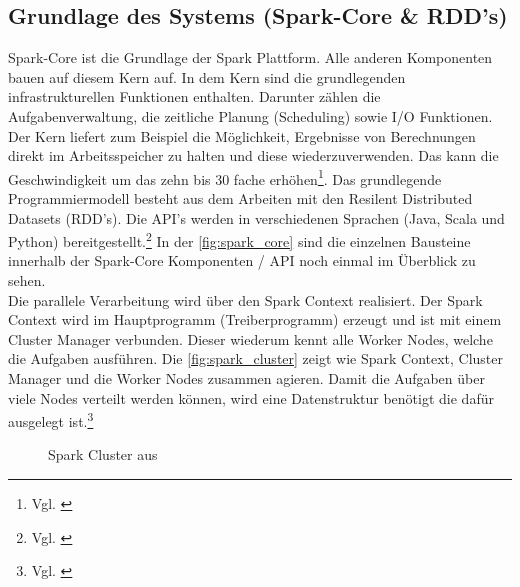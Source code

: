 \newpage
\subsection{Grundlage des Systems (Spark-Core \& RDD’s)}\label{sec_sparkcore}
Spark-Core ist die Grundlage der Spark Plattform. Alle anderen Komponenten bauen auf diesem Kern auf. In dem Kern sind die grundlegenden infrastrukturellen Funktionen enthalten. Darunter zählen die Aufgabenverwaltung, die zeitliche Planung (Scheduling) sowie I/O Funktionen.
Der Kern liefert zum Beispiel die Möglichkeit, Ergebnisse von Berechnungen direkt im Arbeitsspeicher zu halten und diese wiederzuverwenden. Das kann die Geschwindigkeit um das zehn bis 30 fache erhöhen\footnote{Vgl. \cite{VYL+16}}. 
Das grundlegende Programmiermodell besteht aus dem Arbeiten mit den Resilent Distributed Datasets (RDD's). Die API's werden in verschiedenen Sprachen (Java, Scala und Python) bereitgestellt.\footnote{Vgl. \cite{DATABRICK_ABOUT}} In der \autoref{fig:spark_core} sind die einzelnen Bausteine innerhalb der Spark-Core Komponenten / API noch einmal im Überblick zu sehen. \\
 

\noindent
Die parallele Verarbeitung wird über den Spark Context realisiert. Der Spark Context wird im Hauptprogramm (Treiberprogramm) erzeugt und ist mit einem Cluster Manager verbunden. Dieser wiederum kennt alle Worker Nodes, welche die Aufgaben ausführen. Die \autoref{fig:spark_cluster} zeigt wie Spark Context, Cluster Manager und die Worker Nodes zusammen agieren. Damit die Aufgaben über viele Nodes verteilt werden können, wird eine Datenstruktur benötigt die dafür ausgelegt ist.\footnote{Vgl. \cite[101]{BDS16}}

\begin{figure}[h]
  \centering
  \caption{Spark Cluster aus \cite{SPCLUSTER}}\label{fig:spark_cluster}
\end{figure}




